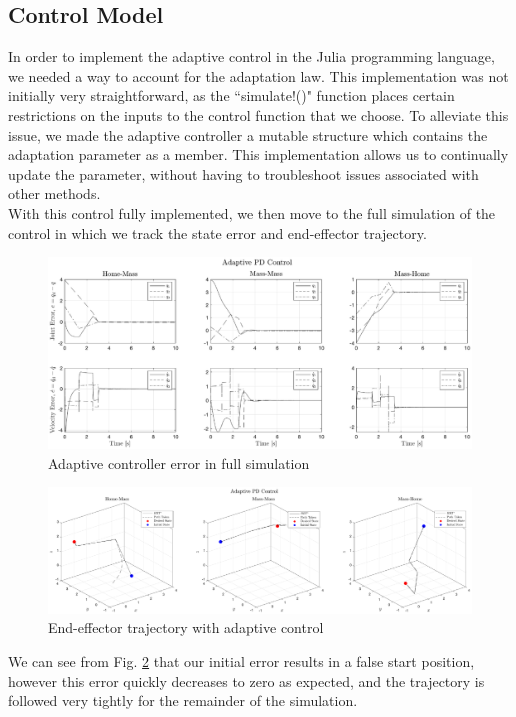 \subsection*{Control Model}
In order to implement the adaptive control in the Julia programming language, we needed a way to account for the adaptation law. This implementation was not initially very straightforward, as the ``simulate!()" function places certain restrictions on the inputs to the control function that we choose. To alleviate this issue, we made the adaptive controller a mutable structure which contains the adaptation parameter as a member. This implementation allows us to continually update the parameter, without having to troubleshoot issues associated with other methods.\\

With this control fully implemented, we then move to the full simulation of the control in which we track the state error and end-effector trajectory.
\begin{figure}[H]
	\centering
	\includegraphics[width=\textwidth]{figures/mass10NNerrAPD.eps}
	\caption{Adaptive controller error in full simulation}
	\label{fig:nnerrapd}
\end{figure}
\begin{figure}[H]
	\centering
	\includegraphics[width=\textwidth]{figures/mass10NNeetrajAPD.eps}
	\caption{End-effector trajectory with adaptive control}
	\label{fig:nntrajapd}
\end{figure}
\noindent We can see from Fig. \ref{fig:nntrajapd} that our initial error results in a false start position, however this error quickly decreases to zero as expected, and the trajectory is followed very tightly for the remainder of the simulation.

